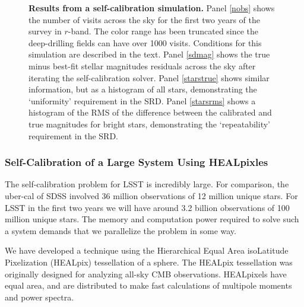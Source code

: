 \documentclass[12pt,preprint]{aastex}
\begin{document}
\begin{figure}
{\begin{minipage}{6.5in}
\caption{{\small {\bf Results from a self-calibration simulation.}
Panel \ref{nobs} shows the number of visits across the sky for the
first two years of the survey in $r$-band.  The color range has been
truncated since the deep-drilling fields can have over 1000 visits.
Conditions for this simulation are described in the text.  Panel
\ref{sdmag} shows the true minus best-fit stellar magnitudes residuals
across the sky after iterating the self-calibration solver. Panel
\ref{starstrue} shows similar information, but as a histogram of all
stars, demonstrating the `uniformity' requirement in the SRD. Panel
\ref{starsrms} shows a histogram of the RMS of the difference between
the calibrated and true magnitudes for bright stars, demonstrating the
`repeatability' requirement in the SRD.  }}
\label{fig:selfcal_fiducial}
\end{minipage}
}
\end{figure}


\subsubsection{Self-Calibration of a Large System Using HEALpixles}

The self-calibration problem for LSST is incredibly large.  For comparison, the uber-cal of SDSS involved 36 million observations of 12 million unique stars.  For LSST in the first two years we will have around 3.2 billion observations of 100 million unique stars.  The memory and computation power required to solve such a system demands that we parallelize the problem in some way.

We have developed a technique using the Hierarchical Equal Area isoLatitude Pixelization (HEALpix) tessellation of a sphere.  The HEALpix tessellation was originally designed for analyzing all-sky CMB observations.  HEALpixels have equal area, and are distributed to make fast calculations of multipole moments and power spectra.  
\end{document}
